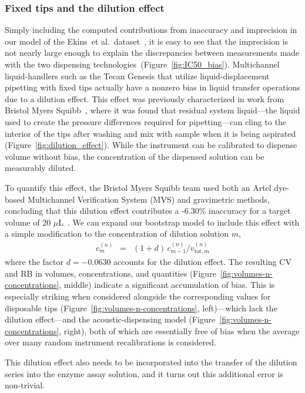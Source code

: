 \documentclass[aps,pre,twocolumn,nofootinbib,superscriptaddress,linenumbers]{revtex4-1}
\begin{document}
\subsubsection*{Fixed tips and the dilution effect}

Simply including the computed contributions from inaccuracy and imprecision in our model of the  Ekins~et al.~dataset~\cite{ekins_dispensing_2013}, it is easy to see that the imprecision is not nearly large enough to explain the discrepancies between measurements made with the two dispensing technologies~(Figure~\ref{fig:IC50_bias}).
Multichannel liquid-handlers such as the Tecan Genesis that utilize liquid-displacement pipetting with fixed tips actually have a nonzero bias in liquid transfer operations due to a dilution effect. 
This effect was previously characterized in work from Bristol Myers Squibb~\cite{dong_use_2006,gu_dilution_2007}, where it was found that residual system liquid---the liquid used to create the pressure differences required for pipetting---can cling to the interior of the tips after washing and mix with sample when it is being aspirated (Figure~\ref{fig:dilution_effect}). 
While the instrument can be calibrated to dispense volume without bias, the concentration of the dispensed solution can be measurably diluted.

To quantify this effect, the Bristol Myers Squibb team used both an Artel dye-based Multichannel Verification System (MVS) and gravimetric methods, concluding that this dilution effect contributes a -6.30\% inaccuracy for a target volume of 20 $\mu$L~\cite{dong_use_2006}.
We can expand our bootstrap model to include this effect with a simple modification to the concentration of dilution solution $m$,
\begin{eqnarray}
c_m^{(n)} &=& (1 + d) \, c_{m-1}^{(n)} / v_{\mathrm{tot},m}^{(n)}
\end{eqnarray}
where the factor $d = -0.0630$ accounts for the dilution effect.
The resulting CV and RB in volumes, concentrations, and quantities (Figure~\ref{fig:volumes-n-concentrations}, middle) indicate a significant accumulation of bias.
This is especially striking when considered alongside the corresponding values for disposable tips (Figure~\ref{fig:volumes-n-concentrations}, left)---which lack the dilution effect---and the acoustic-dispensing model (Figure~\ref{fig:volumes-n-concentrations}, right), both of which are essentially free of bias when the average over many random instrument recalibrations is considered.

This dilution effect also needs to be incorporated into the transfer of the dilution series into the enzyme assay solution, and it turns out this additional error is non-trivial.
\end{document}
